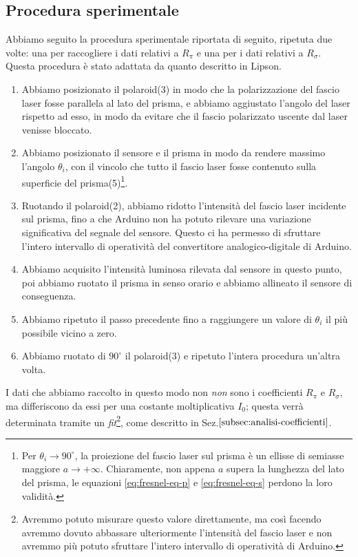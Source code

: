 \subsection{Procedura sperimentale}\label{subsec:procedura-sperimentale}
  Abbiamo seguito la procedura sperimentale riportata di seguito, ripetuta due
  volte: una per raccogliere i dati relativi a $R_\pi$ e una per i dati relativi
  a $R_\sigma$. Questa procedura è stato adattata da quanto descritto in Lipson\cite{lipson20}.
  \begin{enumerate}
    \item%
      Abbiamo posizionato il polaroid(3) in modo che la polarizzazione del
      fascio laser fosse parallela al lato del prisma, e abbiamo aggiustato l'angolo
      del laser rispetto ad esso, in modo da evitare che il fascio
      polarizzato uscente dal laser venisse bloccato.
    \item%
      Abbiamo posizionato il sensore e il prisma in modo da rendere
      massimo l'angolo $\theta_i$, con il vincolo che
      tutto il fascio laser fosse contenuto sulla superficie del prisma(5)\footnote{Per $\theta_i \to 90^\circ$, la
      proiezione del fascio laser sul prisma è un ellisse di semiasse maggiore $a \to +\infty$. Chiaramente, non appena
      $a$ supera la lunghezza del lato del prisma, le equazioni \eqref{eq:fresnel-eq-p} e \eqref{eq:fresnel-eq-s} perdono
      la loro validità.}.
    \item%
      Ruotando il polaroid(2), abbiamo ridotto l’intensità del fascio laser
      incidente sul prisma, fino a che Arduino non ha potuto rilevare una
      variazione significativa del segnale del sensore.
      Questo ci ha permesso di sfruttare l'intero intervallo di operatività del convertitore analogico-digitale di Arduino.
    \item%
      Abbiamo acquisito l'intensità luminosa rilevata dal sensore in questo punto,
      poi abbiamo ruotato il prisma in senso orario e abbiamo
      allineato il sensore di conseguenza.
    \item%
      Abbiamo ripetuto il passo precedente fino a raggiungere un valore di $\theta_i$
      il più possibile vicino a zero.
    \item%
      Abbiamo ruotato di $90^\circ$ il polaroid(3) e ripetuto l'intera
      procedura un'altra volta.
  \end{enumerate}
  I dati che abbiamo raccolto in questo modo non \emph{non} sono
  i coefficienti $R_\pi$ e $R_\sigma$, ma differiscono da essi per una costante
  moltiplicativa $I_0$; questa verrà determinata tramite un \emph{fit}\footnote{Avremmo potuto misurare
  questo valore direttamente, ma così facendo avremmo dovuto
  abbassare ulteriormente l'intensità del fascio laser e non avremmo più potuto
  sfruttare l'intero intervallo di operatività di Arduino.}, come descritto in Sez.$\ref{subsec:analisi-coefficienti}$.
\endinput

